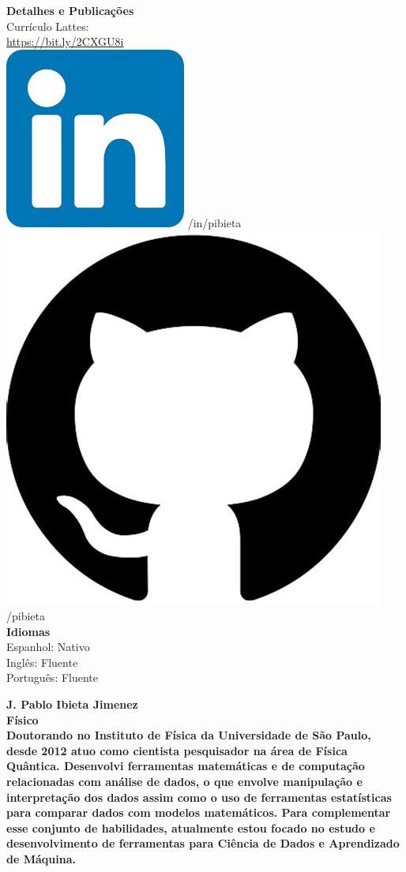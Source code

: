 \documentclass[a4paper,12pt,final]{memoir}
\newcommand{\Sep}{\vspace{1.5em}}
\newenvironment{AboutMe}
	{\ignorespaces\textbf{\color{RoyalBlue}}}
	{\Sep\ignorespacesafterend}
\begin{document}
\begin{flushleft}
	\textbf{Detalhes e Publicações}\\
	\vspace{1mm}
	Currículo Lattes: \\
	\vspace{1mm}
	\url{https://bit.ly/2CXGU8i}\\
	\vspace{1mm}
    \includegraphics[width=0.07\columnwidth]{in_icon.png} /in/pibieta \\
    \vspace{1mm}
    \includegraphics[width=0.07\columnwidth]{git.jpeg} /pibieta \\
    \vspace{1mm}
    \vspace{4mm}
	\textbf{Idiomas}\\
	\vspace{1mm}
	Espanhol: Nativo\\
	\vspace{1mm}
	Inglês: Fluente\\
	\vspace{1mm}
	Português: Fluente\\
	\vspace{1mm}
\end{flushleft}\normalsize


\framebreak



\Huge\bfseries {\color{RoyalBlue}J. Pablo Ibieta Jimenez} \\
\Large\bfseries Físico \\

\normalsize\normalfont
\vspace{-20pt} 
\begin{AboutMe}
Doutorando no Instituto de Física da Universidade de São Paulo, desde 2012 atuo como cientista pesquisador na área de Física Quântica. Desenvolvi ferramentas matemáticas e de computação relacionadas com análise de dados, o que envolve manipulação e interpretação dos dados assim como o uso de ferramentas estatísticas para comparar dados com modelos matemáticos. Para complementar esse conjunto de habilidades, atualmente estou focado no estudo e desenvolvimento de ferramentas para Ciência de Dados e Aprendizado de Máquina.   
\end{AboutMe}
\end{document}

